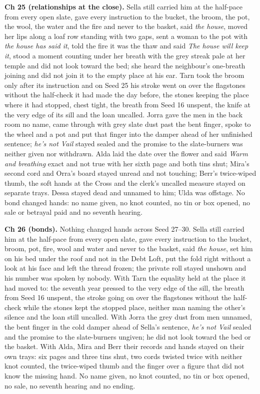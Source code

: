 \documentclass{design/chronicle}
\begin{document}
{\textbf{Ch 25 (relationships at the close).} Sella still carried him at the half-pace from every open slate, gave every instruction to the bucket, the broom, the pot, the wool, the water and the fire and never to the basket, said \emph{the house}, moved her lips along a loaf row standing with two gaps, sent a woman to the pot with \emph{the house has said it}, told the fire it was the thaw and said \emph{The house will keep it}, stood a moment counting under her breath with the grey streak pale at her temple and did not look toward the bed; she heard the neighbour’s one-breath joining and did not join it to the empty place at his ear. Tarn took the broom only after its instruction and on Seed 25 his stroke went on over the flagstones without the half-check it had made the day before, the stones keeping the place where it had stopped, chest tight, the breath from Seed 16 unspent, the knife at the very edge of its sill and the loan uncalled. Jorra gave the men in the back room no name, came through with grey slate dust past the bent finger, spoke to the wheel and a pot and put that finger into the damper ahead of her unfinished sentence; \emph{he’s not Vail} stayed sealed and the promise to the slate-burners was neither given nor withdrawn. Alda laid the date over the flower and said \emph{Warm and breathing} exact and not true with her sixth page and both tins shut; Mira’s second cord and Orra’s board stayed unread and not touching; Berr’s twice-wiped thumb, the soft hands at the Cross and the clerk’s uncalled measure stayed on separate trays. Dessa stayed dead and unnamed to him; Ulda was offstage. No bond changed hands: no name given, no knot counted, no tin or box opened, no sale or betrayal paid and no seventh hearing.

\textbf{Ch 26 (bonds).} Nothing changed hands across Seed 27–30. Sella still carried him at the half-pace from every open slate, gave every instruction to the bucket, broom, pot, fire, wool and water and never to the basket, said \emph{the house}, set him on his bed under the roof and not in the Debt Loft, put the fold right without a look at his face and left the thread frozen; the private roll stayed unshown and his number was spoken by nobody. With Tarn the equality held at the place it had moved to: the seventh year pressed to the very edge of the sill, the breath from Seed 16 unspent, the stroke going on over the flagstones without the half-check while the stones kept the stopped place, neither man naming the other’s silence and the loan still uncalled. With Jorra the grey dust from men unnamed, the bent finger in the cold damper ahead of Sella’s sentence, \emph{he’s not Vail} sealed and the promise to the slate-burners ungiven; he did not look toward the bed or the basket. With Alda, Mira and Berr their records and hands stayed on their own trays: six pages and three tins shut, two cords twisted twice with neither knot counted, the twice-wiped thumb and the finger over a figure that did not know the missing hand. No name given, no knot counted, no tin or box opened, no sale, no seventh hearing and no ending.

}
\end{document}
